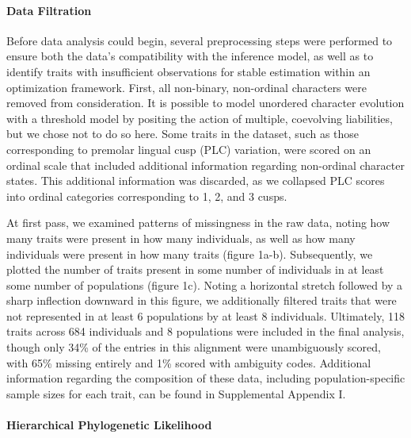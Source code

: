 \documentclass[12pt, twocolumn, twoside]{article}
\begin{document}
\paragraph{Data Filtration}

Before data analysis could begin, several preprocessing steps were performed to ensure both the data's compatibility with the inference model, as well as to identify traits with insufficient observations for stable estimation within an optimization framework. First, all non-binary, non-ordinal characters were removed from consideration. It is possible to model unordered character evolution with a threshold model by positing the action of multiple, coevolving liabilities, but we chose not to do so here. Some traits in the dataset, such as those corresponding to premolar lingual cusp (PLC) variation, were scored on an ordinal scale that included additional information regarding non-ordinal character states. This additional information was discarded, as we collapsed PLC scores into ordinal categories corresponding to 1, 2, and 3 cusps.

At first pass, we examined patterns of missingness in the raw data, noting how many traits were present in how many individuals, as well as how many individuals were present in how many traits (figure 1a-b). Subsequently, we plotted the number of traits present in some number of individuals in at least some number of populations (figure 1c). Noting a horizontal stretch followed by a sharp inflection downward in this figure, we additionally filtered traits that were not represented in at least 6 populations by at least 8 individuals. Ultimately, 118 traits across 684 individuals and 8 populations were included in the final analysis, though only 34\% of the entries in this alignment were unambiguously scored, with 65\% missing entirely and 1\% scored with ambiguity codes. Additional information regarding the composition of these data, including population-specific sample sizes for each trait, can be found in Supplemental Appendix I.

\paragraph{Hierarchical Phylogenetic Likelihood}
\end{document}
